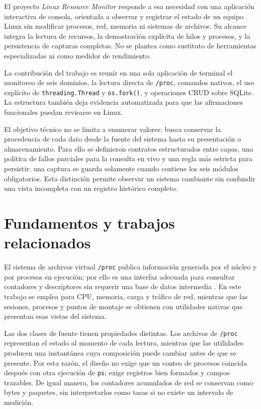 \documentclass[conference]{IEEEtran}
\begin{document}
El proyecto \textit{Linux Resource Monitor} responde a esa necesidad con una aplicaci\'on interactiva de consola, orientada a observar y registrar el estado de un equipo Linux sin modificar procesos, red, memoria ni sistemas de archivos. Su alcance integra la lectura de recursos, la demostraci\'on expl\'icita de hilos y procesos, y la persistencia de capturas completas. No se plantea como sustituto de herramientas especializadas ni como medidor de rendimiento.

La contribuci\'on del trabajo es reunir en una sola aplicaci\'on de terminal el monitoreo de seis dominios, la lectura directa de \texttt{/proc}, comandos nativos, el uso expl\'icito de \texttt{threading.Thread} y \texttt{os.fork()}, y operaciones CRUD sobre SQLite. La estructura tambi\'en deja evidencia automatizada para que las afirmaciones funcionales puedan revisarse en Linux.

El objetivo t\'ecnico no se limita a enumerar valores: busca conservar la procedencia de cada dato desde la fuente del sistema hasta su presentaci\'on o almacenamiento. Para ello se definieron contratos estructurados entre capas, una pol\'itica de fallos parciales para la consulta en vivo y una regla m\'as estricta para persistir: una captura se guarda solamente cuando contiene los seis m\'odulos obligatorios. Esta distinci\'on permite observar un sistema cambiante sin confundir una vista incompleta con un registro hist\'orico completo.

\section{Fundamentos y trabajos relacionados}
El sistema de archivos virtual \texttt{/proc} publica informaci\'on generada por el n\'ucleo y por procesos en ejecuci\'on; por ello es una interfaz adecuada para consultar contadores y descriptores sin requerir una base de datos intermedia \cite{linuxproc}. En este trabajo se emplea para CPU, memoria, carga y tr\'afico de red, mientras que las sesiones, procesos y puntos de montaje se obtienen con utilidades nativas que presentan esas vistas del sistema.

Las dos clases de fuente tienen propiedades distintas. Los archivos de \texttt{/proc} representan el estado al momento de cada lectura, mientras que las utilidades producen una instant\'anea cuya composici\'on puede cambiar antes de que se presente. Por esta raz\'on, el dise\~no no exige que un conteo de procesos coincida despu\'es con otra ejecuci\'on de \texttt{ps}; exige registros bien formados y campos trazables. De igual manera, los contadores acumulados de red se conservan como bytes y paquetes, sin interpretarlos como tasas si no existe un intervalo de medici\'on.
\end{document}
